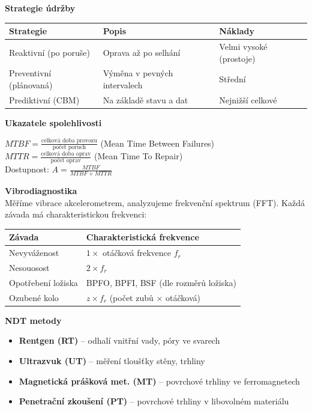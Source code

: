 \documentclass[a4paper,10pt]{article}
\begin{document}
\begin{vysvetlenibox}
\textbf{Strategie údržby}

\begin{center}
\begin{tabularx}{0.95\linewidth}{@{} l X X @{}}
    \toprule
    \textbf{Strategie} & \textbf{Popis} & \textbf{Náklady} \\
    \midrule
    Reaktivní (po poruše) & Oprava až po selhání & Velmi vysoké (prostoje) \\
    Preventivní (plánovaná) & Výměna v pevných intervalech & Střední \\
    Prediktivní (CBM) & Na základě stavu a dat & Nejnižší celkové \\
    \bottomrule
\end{tabularx}
\end{center}

\textbf{Ukazatele spolehlivosti}

\begin{vzorcebox}
$MTBF = \frac{\text{celková doba provozu}}{\text{počet poruch}}$
\quad (Mean Time Between Failures)\\
$MTTR = \frac{\text{celková doba oprav}}{\text{počet oprav}}$
\quad (Mean Time To Repair)\\
Dostupnost: $A = \frac{MTBF}{MTBF + MTTR}$
\end{vzorcebox}

\textbf{Vibrodiagnostika}\\
Měříme vibrace akcelerometrem, analyzujeme frekvenční spektrum (FFT).
Každá závada má charakteristickou frekvenci:

\begin{center}
\begin{tabularx}{0.95\linewidth}{@{} l X @{}}
    \toprule
    \textbf{Závada} & \textbf{Charakteristická frekvence} \\
    \midrule
    Nevyváženost    & $1\times$ otáčková frekvence $f_r$ \\
    Nesouosost      & $2\times f_r$ \\
    Opotřebení ložiska & BPFO, BPFI, BSF (dle rozměrů ložiska) \\
    Ozubené kolo    & $z \times f_r$ (počet zubů $\times$ otáčková) \\
    \bottomrule
\end{tabularx}
\end{center}

\textbf{NDT metody}
\begin{itemize}[noitemsep, leftmargin=1.4em, topsep=4pt]
    \item \textbf{Rentgen (RT)} -- odhalí vnitřní vady, póry ve svarech
    \item \textbf{Ultrazvuk (UT)} -- měření tloušťky stěny, trhliny
    \item \textbf{Magnetická prášková met. (MT)} -- povrchové trhliny ve ferromagnetech
    \item \textbf{Penetrační zkoušení (PT)} -- povrchové trhliny v libovolném materiálu
\end{itemize}
\end{vysvetlenibox}


\end{document}
